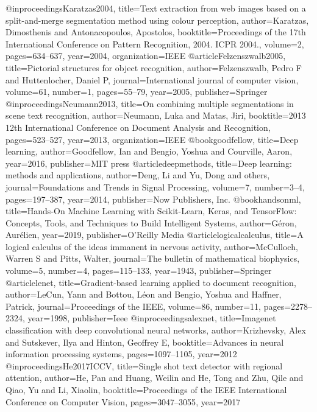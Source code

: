 @inproceedings{Karatzas2004,
  title={Text extraction from web images based on a split-and-merge segmentation method using colour perception},
  author={Karatzas, Dimosthenis and Antonacopoulos, Apostolos},
  booktitle={Proceedings of the 17th International Conference on Pattern Recognition, 2004. ICPR 2004.},
  volume={2},
  pages={634--637},
  year={2004},
  organization={IEEE}
}
@article{Felzenszwalb2005,
  title={Pictorial structures for object recognition},
  author={Felzenszwalb, Pedro F and Huttenlocher, Daniel P},
  journal={International journal of computer vision},
  volume={61},
  number={1},
  pages={55--79},
  year={2005},
  publisher={Springer}
}
@inproceedings{Neumann2013,
  title={On combining multiple segmentations in scene text recognition},
  author={Neumann, Luka and Matas, Jiri},
  booktitle={2013 12th International Conference on Document Analysis and Recognition},
  pages={523--527},
  year={2013},
  organization={IEEE}
}
@book{goodfellow,
  title={Deep learning},
  author={Goodfellow, Ian and Bengio, Yoshua and Courville, Aaron},
  year={2016},
  publisher={MIT press}
}
@article{deepmethods,
  title={Deep learning: methods and applications},
  author={Deng, Li and Yu, Dong and others},
  journal={Foundations and Trends{\textregistered} in Signal Processing},
  volume={7},
  number={3--4},
  pages={197--387},
  year={2014},
  publisher={Now Publishers, Inc.}
}
@book{handsonml,
  title={Hands-On Machine Learning with Scikit-Learn, Keras, and TensorFlow: Concepts, Tools, and Techniques to Build Intelligent Systems},
  author={G{\'e}ron, Aur{\'e}lien},
  year={2019},
  publisher={O'Reilly Media}
}
@article{logicalcalculus,
  title={A logical calculus of the ideas immanent in nervous activity},
  author={McCulloch, Warren S and Pitts, Walter},
  journal={The bulletin of mathematical biophysics},
  volume={5},
  number={4},
  pages={115--133},
  year={1943},
  publisher={Springer}
}
@article{lenet,
  title={Gradient-based learning applied to document recognition},
  author={LeCun, Yann and Bottou, L{\'e}on and Bengio, Yoshua and Haffner, Patrick},
  journal={Proceedings of the IEEE},
  volume={86},
  number={11},
  pages={2278--2324},
  year={1998},
  publisher={Ieee}
}
@inproceedings{alexnet,
  title={Imagenet classification with deep convolutional neural networks},
  author={Krizhevsky, Alex and Sutskever, Ilya and Hinton, Geoffrey E},
  booktitle={Advances in neural information processing systems},
  pages={1097--1105},
  year={2012}
}
@inproceedings{He2017ICCV,
  title={Single shot text detector with regional attention},
  author={He, Pan and Huang, Weilin and He, Tong and Zhu, Qile and Qiao, Yu and Li, Xiaolin},
  booktitle={Proceedings of the IEEE International Conference on Computer Vision},
  pages={3047--3055},
  year={2017}
}
